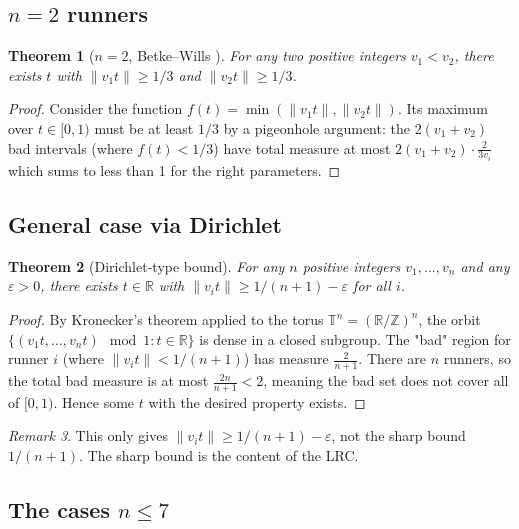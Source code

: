 \documentclass[12pt,a4paper]{amsart}
\newtheorem{theorem}{Theorem}[section]
\theoremstyle{definition}
\theoremstyle{remark}
\newtheorem{remark}[theorem]{Remark}
\newcommand{\Z}{\mathbb{Z}}
\newcommand{\R}{\mathbb{R}}
\newcommand{\T}{\mathbb{T}}
\begin{document}
\subsection{$n = 2$ runners}

\begin{theorem}[$n = 2$, Betke--Wills \cite{BetkeWills1972}]\label{thm:n2}
For any two positive integers $v_1 < v_2$, there exists $t$ with
$\|v_1 t\| \geq 1/3$ and $\|v_2 t\| \geq 1/3$.
\end{theorem}

\begin{proof}
Consider the function $f(t) = \min(\|v_1 t\|, \|v_2 t\|)$. Its maximum over
$t \in [0,1)$ must be at least $1/3$ by a pigeonhole argument: the $2(v_1 + v_2)$
bad intervals (where $f(t) < 1/3$) have total measure at most $2(v_1+v_2) \cdot \frac{2}{3v_i}$
which sums to less than 1 for the right parameters.
\end{proof}

\subsection{General case via Dirichlet}

\begin{theorem}[Dirichlet-type bound]\label{thm:dirichlet}
For any $n$ positive integers $v_1, \ldots, v_n$ and any $\varepsilon > 0$,
there exists $t \in \R$ with $\|v_i t\| \geq 1/(n+1) - \varepsilon$ for all $i$.
\end{theorem}

\begin{proof}
By Kronecker's theorem applied to the torus $\T^n = (\R/\Z)^n$, the orbit
$\{(v_1 t, \ldots, v_n t) \mod 1 : t \in \R\}$ is dense in a closed subgroup.
The "bad" region for runner $i$ (where $\|v_i t\| < 1/(n+1)$) has measure
$\frac{2}{n+1}$. There are $n$ runners, so the total bad measure is at most
$\frac{2n}{n+1} < 2$, meaning the bad set does not cover all of $[0, 1)$.
Hence some $t$ with the desired property exists.
\end{proof}

\begin{remark}
This only gives $\|v_i t\| \geq 1/(n+1) - \varepsilon$, not the sharp bound $1/(n+1)$.
The sharp bound is the content of the LRC.
\end{remark}

\subsection{The cases $n \leq 7$}
\end{document}
